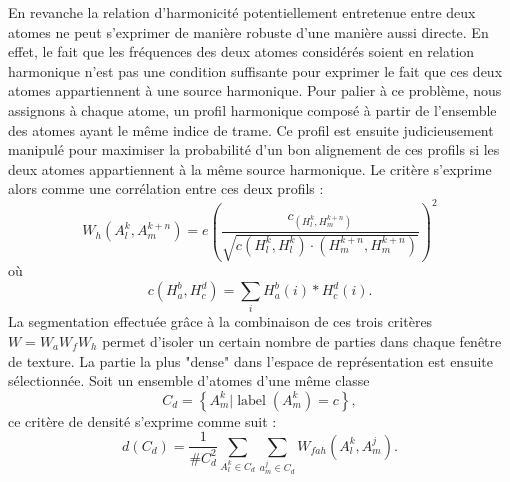 En revanche la relation d'harmonicité potentiellement entretenue entre deux atomes ne peut s'exprimer de manière robuste d'une manière aussi directe. En effet, le fait que les fréquences des deux atomes considérés soient en relation harmonique n'est pas une condition suffisante pour exprimer le fait que ces deux atomes appartiennent à une source harmonique. Pour palier à ce problème, nous assignons à chaque atome, un profil harmonique composé à partir de l'ensemble des atomes ayant le même indice de trame. Ce profil est ensuite judicieusement manipulé pour maximiser la probabilité d'un bon alignement de ces profils si les deux atomes appartiennent à la même source harmonique\cite{lagrangeTaslp08}. Le critère s'exprime alors comme une corrélation entre ces deux profils :
\begin{equation}
  { W _ { h } \left( A _ { l } ^ { k } , A _ { m } ^ { k + n } \right) = e \left( \frac { c _ { \left( H _ { l } ^ { k } , H _ { m } ^ { k + n } \right) } } { \sqrt { c \left( H _ { l } ^ { k } , H _ { l } ^ { k } \right) \cdot \left( H _ { m } ^ { k + n } , H _ { m } ^ { k + n } \right) } } \right) ^ { 2 } }
\end{equation}
où
\begin{equation}
  { c \left( H _ { a } ^ { b } , H _ { c } ^ { d } \right) = \sum _ { i } H _ { a } ^ { b } ( i ) * H _ { c } ^ { d } ( i ) }.
  \end{equation}
  La segmentation effectuée grâce à la combinaison de ces trois critères $W = W_a W_f W_h$ permet d'isoler un certain nombre de parties dans chaque fenêtre de texture. La partie la plus "dense" dans l'espace de représentation est ensuite sélectionnée. Soit un ensemble d'atomes d'une même classe
  $$C _ { d } = \left\{ A _ { m } ^ { k } | \operatorname { label } \left( A _ { m } ^ { k } \right) = c \right\},$$
  ce critère de densité s'exprime comme suit :
  \begin{equation}
    d \left( C _ { d } \right) = \frac { 1 } { \# C _ { d } ^ { 2 } } \sum _ { A _ { l } ^ { k } \in C _ { d } } \sum _ { a _ { m } ^ { j } \in C _ { d } } W _ { f a h } \left( A _ { l } ^ { k } , A _ { m } ^ { j } \right).
  \end{equation}




